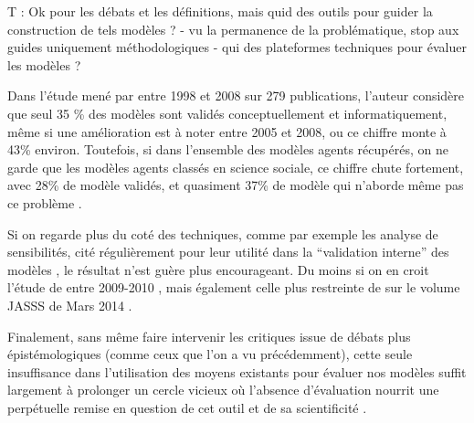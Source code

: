 T : Ok pour les débats et les définitions, mais quid des outils pour guider la construction de tels modèles ?
	- vu la permanence de la problématique, stop aux guides uniquement méthodologiques
	- qui des plateformes techniques pour évaluer les modèles ?


Dans l'étude mené par \textcite{Heath2009} entre 1998 et 2008 sur 279 publications, l'auteur considère que seul 35 \% des modèles sont validés conceptuellement et informatiquement, même si une amélioration est à noter entre 2005 et 2008, ou ce chiffre monte à 43\% environ. Toutefois, si dans l'ensemble des modèles agents récupérés, on ne garde que les modèles agents classés en science sociale, ce chiffre chute fortement, avec 28\% de modèle validés, et quasiment 37\% de modèle qui n'aborde même pas ce problème .

Si on regarde plus du coté des techniques, comme par exemple les analyse de sensibilités, cité régulièrement pour leur utilité dans la \enquote{validation interne} des modèles \autocite{Amblard2006}, le résultat n'est guère plus encourageant. Du moins si on en croit l'étude de \textcite{Thiele2014} entre 2009-2010 , mais également celle plus restreinte de \textcite{Cottineau2015} sur le volume JASSS de Mars 2014 .

Finalement, sans même faire intervenir les critiques issue de débats plus épistémologiques (comme ceux que l'on a vu précédemment), cette seule insuffisance dans l'utilisation des moyens existants pour évaluer nos modèles suffit largement à prolonger un cercle vicieux où l'absence d'évaluation nourrit une perpétuelle remise en question de cet outil et de sa scientificité . 
